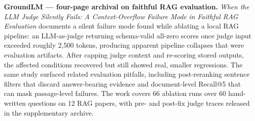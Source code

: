 \documentclass[11pt]{article}
\begin{document}
\textbf{GroundLM --- four-page archival on faithful RAG evaluation.}
\emph{When the LLM Judge Silently Fails: A Context-Overflow Failure Mode in Faithful RAG Evaluation} documents a silent failure mode found while ablating a local RAG pipeline: an LLM-as-judge returning schema-valid all-zero scores once judge input exceeded roughly 2{,}500 tokens, producing apparent pipeline collapses that were evaluation artifacts. After capping judge context and re-scoring stored outputs, the affected conditions recovered but still showed real, smaller regressions. The same study surfaced related evaluation pitfalls, including post-reranking sentence filters that discard answer-bearing evidence and document-level Recall@5 that can mask passage-level failures. The work covers 66 ablation runs over 60 hand-written questions on 12 RAG papers, with pre- and post-fix judge traces released in the supplementary archive.
\end{document}
